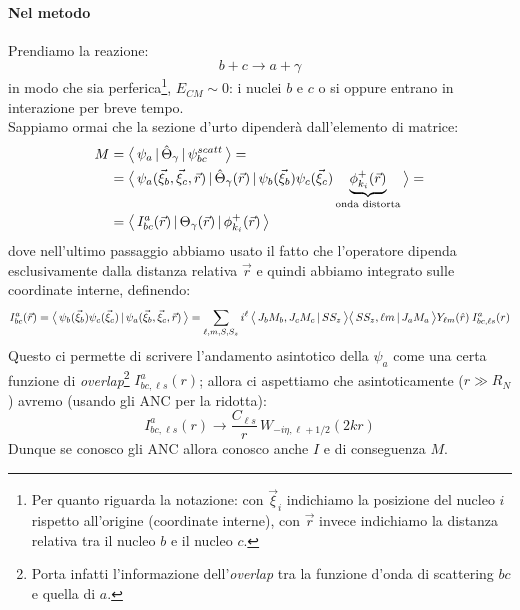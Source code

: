\paragraph{Nel metodo}
Prendiamo la reazione:
$$b+c \to a+\gamma$$
in modo che sia perferica\footnote{Per quanto riguarda la notazione: con $\vec{\xi}_i$ indichiamo la posizione del nucleo $i$ rispetto all'origine (coordinate interne), con $\vec{r}$ invece indichiamo la distanza relativa tra il nucleo $b$ e il nucleo $c$.}, $E_{CM}\sim 0$: i nuclei $b$ e $c$ o si  oppure entrano in interazione per breve tempo.\\ 
Sappiamo ormai che la sezione d'urto dipenderà dall'elemento di matrice:
\begin{align*}
	M 
	&= \bigl\langle\, \psi_a\, |\,\hat{\Theta}_\gamma\, |\,\psi_{bc}^{scatt}\, \bigr\rangle =\\
	&= \bigl\langle\, \psi_a (\vec{\xi}_b,\vec{\xi}_c,\vec{r})\, |\,\hat{\Theta}_\gamma (	\vec{r})\, |\,\psi_{b}(\vec{\xi}_b)\psi_c(\vec{\xi}_c)\underbrace{\phi^+_{k_i}(\vec{r})}_\text{onda distorta}\, \bigr\rangle =\\ 
	&= \bigl\langle\, I_{bc}^a(\vec{r})\, |\,\Theta_\gamma(\vec{r})\, |\,\phi^+_{k_i}(\vec{r})\, \bigr\rangle
\end{align*}
dove nell'ultimo passaggio abbiamo usato il fatto che l'operatore dipenda esclusivamente dalla distanza relativa $\vec{r}$ e quindi abbiamo integrato sulle coordinate interne, definendo:
$$
I_{bc}^a (\vec{r}) = \bigl\langle\, \psi_b(\vec{\xi}_b)\psi_c(\vec{\xi}_c)\, |\, \psi_a(\vec{\xi}_b,\vec{\xi}_c,\vec{r})\, \bigr\rangle = \sum_{\ell,m,S,S_z} i^\ell \, \bigl\langle\, J_bM_b,J_cM_c\, |\, SS_z\, \bigr\rangle \bigl\langle\, SS_z, \ell m\, |\, J_aM_a\, \bigr\rangle Y_{\ell m}(\hat{r})\:I_{bc,\ell s}^a (r)
$$
Questo ci permette di scrivere l'andamento asintotico della $\psi_a$ come una certa funzione di \textit{overlap}\footnote{Porta infatti l'informazione dell'\textit{overlap} tra la funzione d'onda di scattering $bc$ e quella di $a$.} $I_{bc,\ell s}^a (r)$; allora ci aspettiamo che asintoticamente ($r\gg R_N$) avremo (usando gli ANC per la ridotta):
$$I_{bc,\ell s}^a (r) \to \frac{C_{\ell s}}{r} \, W_{-i\eta,\ell+1/2} (2kr)$$%
Dunque se conosco gli ANC allora conosco anche $I$ e di conseguenza $M$.

